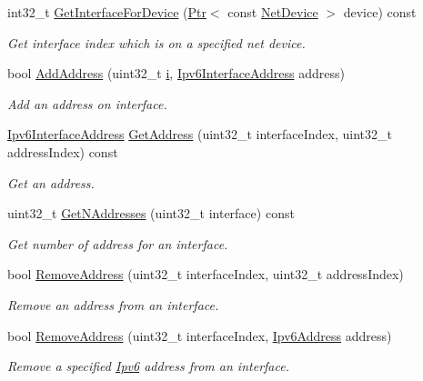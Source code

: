 \begin{DoxyCompactItemize}
int32\+\_\+t \hyperlink{classns3_1_1Ipv6L3Protocol_a878292513d6294e2dfdeccbe1ed1d996}{Get\+Interface\+For\+Device} (\hyperlink{classns3_1_1Ptr}{Ptr}$<$ const \hyperlink{classns3_1_1NetDevice}{Net\+Device} $>$ device) const 
\begin{DoxyCompactList}\small\item\em Get interface index which is on a specified net device. \end{DoxyCompactList}\item 
bool \hyperlink{classns3_1_1Ipv6L3Protocol_a33135677dcaa195be223eaf4f38a6efe}{Add\+Address} (uint32\+\_\+t \hyperlink{lte__uplink__power__control_8m_a6f6ccfcf58b31cb6412107d9d5281426}{i}, \hyperlink{classns3_1_1Ipv6InterfaceAddress}{Ipv6\+Interface\+Address} address)
\begin{DoxyCompactList}\small\item\em Add an address on interface. \end{DoxyCompactList}\item 
\hyperlink{classns3_1_1Ipv6InterfaceAddress}{Ipv6\+Interface\+Address} \hyperlink{classns3_1_1Ipv6L3Protocol_a0321a9ac3f79b5a7b7542cecf11bfe44}{Get\+Address} (uint32\+\_\+t interface\+Index, uint32\+\_\+t address\+Index) const 
\begin{DoxyCompactList}\small\item\em Get an address. \end{DoxyCompactList}\item 
uint32\+\_\+t \hyperlink{classns3_1_1Ipv6L3Protocol_a3b09a9f504a311ecc08fdc026d897514}{Get\+N\+Addresses} (uint32\+\_\+t interface) const 
\begin{DoxyCompactList}\small\item\em Get number of address for an interface. \end{DoxyCompactList}\item 
bool \hyperlink{classns3_1_1Ipv6L3Protocol_a6e955b0de62f2c28fea71108e8df2545}{Remove\+Address} (uint32\+\_\+t interface\+Index, uint32\+\_\+t address\+Index)
\begin{DoxyCompactList}\small\item\em Remove an address from an interface. \end{DoxyCompactList}\item 
bool \hyperlink{classns3_1_1Ipv6L3Protocol_a7e3a0ee9e79a09f208285e4f788ad4ed}{Remove\+Address} (uint32\+\_\+t interface\+Index, \hyperlink{classns3_1_1Ipv6Address}{Ipv6\+Address} address)
\begin{DoxyCompactList}\small\item\em Remove a specified \hyperlink{classns3_1_1Ipv6}{Ipv6} address from an interface. \end{DoxyCompactList}\item 

\end{DoxyCompactItemize}
